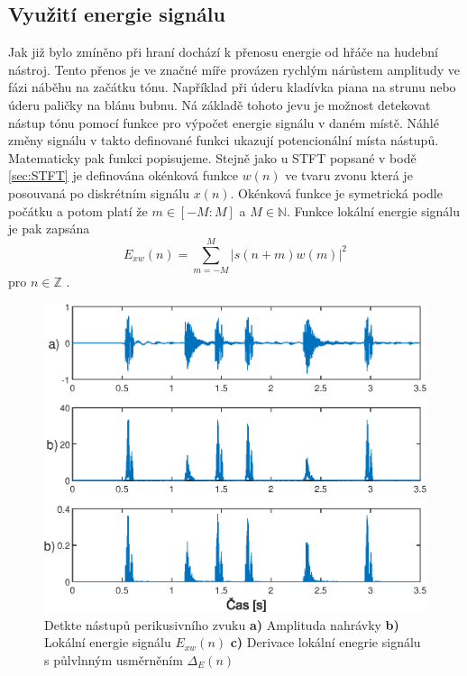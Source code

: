   \subsection{Využití energie signálu} \label{sec:Energie_signalu}

  Jak již bylo zmíněno při hraní dochází k přenosu energie od hřáče na hudební nástroj.
  Tento přenos je ve značné míře provázen rychlým nárůstem amplitudy ve fázi náběhu na začátku tónu.
  Například při úderu kladívka piana na strunu nebo úderu paličky na blánu bubnu.
  Ná základě tohoto jevu je možnost detekovat nástup tónu pomocí funkce pro výpočet energie signálu v daném místě.
  Náhlé změny signálu v takto definované funkci ukazují potencionální místa nástupů.
  Matematicky pak funkci popisujeme. 
  Stejně jako u \acs{STFT} popsané v bodě \ref{sec:STFT} je definována okénková funkce $w(n)$ ve tvaru zvonu  která je posouvaná po diskrétním signálu $x(n)$.
  Okénková funkce je symetrická podle počátku a potom platí že $ m \in [-M : M]$ a $M \in \mathbb{N}$. Funkce lokální energie signálu je pak zapsána
  \begin{equation}
    E_{xw}(n) = \sum_{m = -M}^{M} |s(n+m)w(m)|^2
  \end{equation}
  pro $n \in \mathbb{Z}$ \cite{fundamental_of_music_processing}.

  \begin{figure}[H]
    \centering
    \includegraphics[width = 0.8\linewidth]{obrazky/Energy_based_novely.eps}
    \caption{Detkte nástupů perikusivního zvuku \textbf{a)} Amplituda nahrávky \textbf{b)} Lokální energie signálu $E_{xw}(n)$ \textbf{c)} Derivace lokální enegrie signálu s půlvlnným usměrněním $\Delta_E(n)$}
    \label{fig:energy_based_novelty}
  \end{figure}


